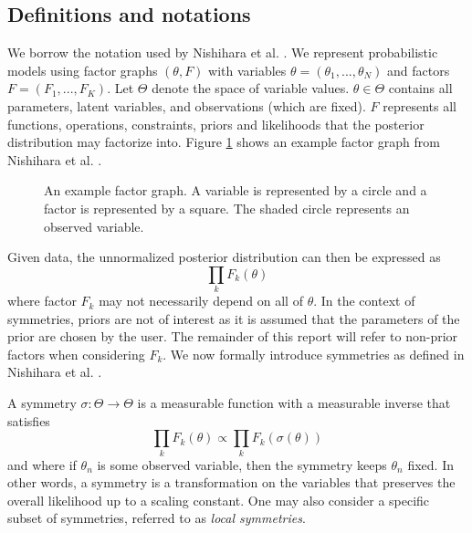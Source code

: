 \subsection{Definitions and notations}

We borrow the notation used by Nishihara et al. \cite{Nishihara:2013}. We represent probabilistic models using factor graphs $(\theta,F)$ with variables $\theta=(\theta_1,...,\theta_N)$ and factors $F=(F_1,...,F_K)$. Let $\Theta$ denote the space of variable values. $\theta\in\Theta$ contains all parameters, latent variables, and observations (which are fixed). $F$ represents all functions, operations, constraints, priors and likelihoods that the posterior distribution may factorize into. Figure \ref{fig:factorgraph} shows an example factor graph from Nishihara et al. \cite{Nishihara:2013}.

\begin{figure}[h]
\begin{center}
\end{center}
\caption{An example factor graph. A variable is represented by a circle and a factor is represented by a square. The shaded circle represents an observed variable.}
\label{fig:factorgraph}
\end{figure}

Given data, the unnormalized posterior distribution can then be expressed as
\[
\prod_kF_k(\theta)
\]
where factor $F_k$ may not necessarily depend on all of $\theta$. In the context of symmetries, priors are not of interest as it is assumed that the parameters of the prior are chosen by the user. The remainder of this report will refer to non-prior factors when considering $F_k$. We now formally introduce symmetries as defined in Nishihara et al. \cite{Nishihara:2013}.
\begin{defn}
A symmetry $\sigma:\Theta\rightarrow\Theta$ is a measurable function with a measurable inverse that satisfies
\[
\prod_kF_k(\theta) \propto \prod_kF_k(\sigma(\theta))
\]
and where if $\theta_n$ is some observed variable, then the symmetry keeps $\theta_n$ fixed. In other words, a symmetry is a transformation on the variables that preserves the overall likelihood up to a scaling constant. One may also consider a specific subset of symmetries, referred to as \textit{local symmetries}.
\end{defn}

